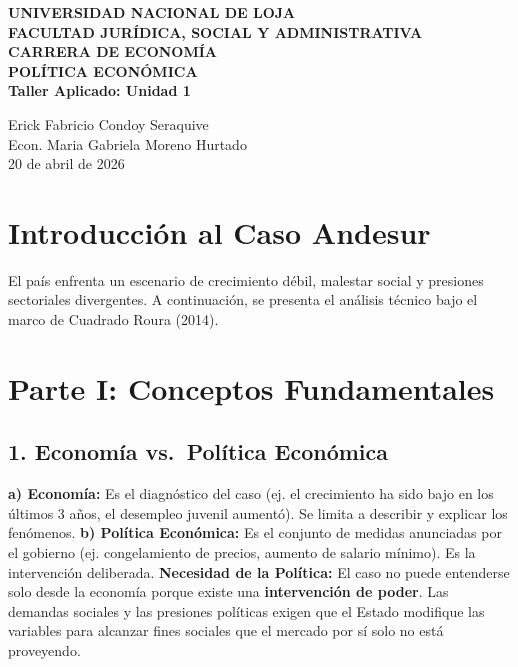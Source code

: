 \documentclass[12pt,spanish]{article}
\begin{document}
\begin{center}
    {\bfseries \Large UNIVERSIDAD NACIONAL DE LOJA}\\[0.3cm]
    {\bfseries \large FACULTAD JURÍDICA, SOCIAL Y
ADMINISTRATIVA}\\[0.2cm]
    {\bfseries CARRERA DE ECONOMÍA}\\[1.5cm]
    
    {\bfseries \large POLÍTICA ECONÓMICA}\\[1cm]
    
    {\bfseries \Large Taller Aplicado: Unidad 1}\\[1.5cm]
\end{center}

 Erick Fabricio Condoy Seraquive \\
 Econ. Maria Gabriela Moreno Hurtado \\
 20 de abril de 2026 \\

\vspace{1cm}

\doublespacing
\setlength{\parindent}{1.27cm}

\section{Introducción al Caso
Andesur}\label{introducciuxf3n-al-caso-andesur}

El país enfrenta un escenario de crecimiento débil, malestar social y
presiones sectoriales divergentes. A continuación, se presenta el
análisis técnico bajo el marco de Cuadrado Roura (2014).

\section{Parte I: Conceptos
Fundamentales}\label{parte-i-conceptos-fundamentales}

\subsection{1. Economía vs.~Política
Económica}\label{economuxeda-vs.-poluxedtica-econuxf3mica}

\textbf{a) Economía:} Es el diagnóstico del caso (ej. el crecimiento ha
sido bajo en los últimos 3 años, el desempleo juvenil aumentó). Se
limita a describir y explicar los fenómenos. \textbf{b) Política
Económica:} Es el conjunto de medidas anunciadas por el gobierno (ej.
congelamiento de precios, aumento de salario mínimo). Es la intervención
deliberada. \textbf{Necesidad de la Política:} El caso no puede
entenderse solo desde la economía porque existe una \textbf{intervención
de poder}. Las demandas sociales y las presiones políticas exigen que el
Estado modifique las variables para alcanzar fines sociales que el
mercado por sí solo no está proveyendo.
\end{document}
